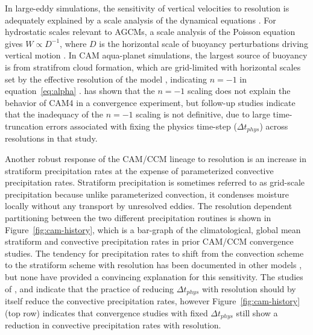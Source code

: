 \documentclass[alpha-refs]{wiley-article}
\begin{document}
In large-eddy simulations, the sensitivity of vertical velocities to resolution is adequately explained by a scale analysis of the dynamical equations \citep{WETAL1997MWR,PG2006JAS,JR2016QJRMS}. For hydrostatic scales relevant to AGCMs, a scale analysis of the Poisson equation gives $W \propto D^{-1}$, where $D$ is the horizontal scale of buoyancy perturbations driving vertical motion \citep{HR2018JAMES}. In CAM aqua-planet simulations, the largest source of buoyancy is from stratifrom cloud formation, which are grid-limited with horizontal scales set by the effective resolution of the model \citep[i.e., some multiple of $\Delta x$;][]{S2011LNCSE}, indicating $n=-1$ in equation~\ref{eq:alpha} \citep{HR2018JAMES}. \cite{HR2017JCLIM} has shown that the $n=-1$ scaling does not explain the behavior of CAM4 in a convergence experiment, but follow-up studies \citep{HR2018JAMES,HETAL2019JAMES} indicate that the inadequacy of the $n=-1$ scaling is not definitive, due to large time-truncation errors associated with fixing the physics time-step ($\Delta t_{phys}$) across resolutions in that study.

Another robust response of the CAM/CCM lineage to resolution is an increase in stratiform precipitation rates at the expense of parameterized convective precipitation rates. Stratiform precipitation is sometimes referred to as grid-scale precipitation because unlike parameterized convection, it condenses moisture locally without any transport by unresolved eddies. The resolution dependent partitioning between the two different precipitation routines is shown in Figure~\ref{fig:cam-history}, which is a bar-graph of the climatological, global mean stratiform and convective precipitation rates in prior CAM/CCM convergence studies. The tendency for precipitation rates to shift from the convection scheme to the stratiform scheme with resolution has been documented in other models \citep{PS2002CD,RETAL2016CD,TETAL2018CD}, but none have provided a convincing explanation for this sensitivity. The studies of \cite{KW1991JGR}, \cite{WETAL1995CD} and \cite{W2013QJRMS} indicate that the practice of reducing $\Delta t_{phys}$ with resolution should by itself reduce the convective precipitation rates, however Figure~\ref{fig:cam-history} (top row) indicates that convergence studies with fixed $\Delta t_{phys}$ still show a reduction in convective precipitation rates with resolution.
\end{document}
